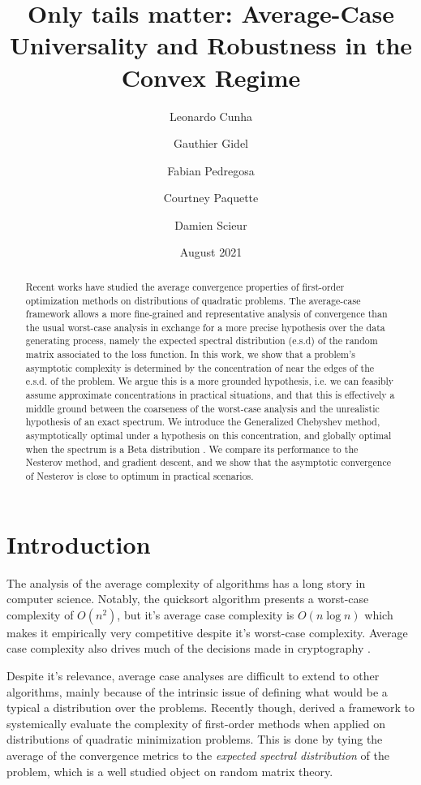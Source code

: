 \documentclass{article}
\title{Only tails matter:
Average-Case Universality and Robustness in the Convex Regime}
\author{Leonardo Cunha
\and Gauthier Gidel \\
\and Fabian Pedregosa \\
\and Courtney Paquette \\
\and Damien Scieur}
\date{August 2021}
\begin{document}
\maketitle
\begin{abstract}
    Recent works have studied the average convergence properties of first-order optimization methods on distributions of quadratic problems. 
    The average-case framework allows a more fine-grained and representative analysis of convergence than the usual worst-case analysis in exchange for a more precise hypothesis over the data generating process, namely the expected spectral distribution (e.s.d) of the random matrix associated to the loss function. 
    In this work, we show that a problem's asymptotic complexity is determined by the concentration of near the edges of the e.s.d. of the problem. We argue this is a more grounded hypothesis, i.e. we can feasibly assume approximate concentrations in practical situations,  and that this is effectively a middle ground between the coarseness of the worst-case analysis and the unrealistic hypothesis of an exact spectrum.
    We introduce the Generalized Chebyshev method, asymptotically optimal under a hypothesis on this concentration, and globally optimal when the spectrum is a Beta distribution .
    We compare its performance to the Nesterov method, and gradient descent, and we show that the asymptotic convergence of Nesterov is close to optimum in practical scenarios.
\end{abstract}
\section{Introduction}
The analysis of the average complexity of algorithms has a long story in computer science. Notably, the quicksort algorithm presents a worst-case complexity of $O(n^2)$, but it's average case complexity is $O(n\log n)$ which makes it  empirically very competitive despite it's worst-case complexity. Average case complexity also drives much of the decisions made in cryptography \citep{bogdanov2006average}.

Despite it's relevance, average case analyses are difficult to extend to other algorithms, mainly because of the intrinsic issue of defining what would be a typical a distribution over the problems. Recently though, \cite{pedregosa2020acceleration}  derived a framework to systemically evaluate the complexity of first-order methods when applied on distributions of quadratic minimization problems. This is done by tying the average of the convergence metrics to the \textit{expected spectral distribution} of the problem, which is a well studied object on random matrix theory.
\end{document}
